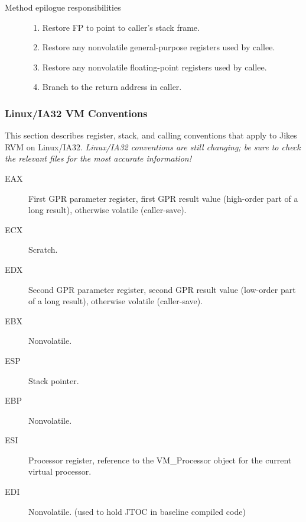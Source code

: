 \begin{description}
\item [Method epilogue responsibilities]

\begin{enumerate}
\item Restore FP to point to caller's stack frame.

\item Restore any nonvolatile general-purpose registers used by callee.

\item Restore any nonvolatile floating-point registers used by callee.

\item Branch to the return address in caller.
\end{enumerate}
\end{description}

\subsubsection{Linux/IA32 VM Conventions} \label{lintel-conventions}

This section describes register, stack, and calling conventions that
apply to Jikes RVM on Linux/IA32.  {\em Linux/IA32 conventions are still
changing; be sure to check the relevant files for the most accurate
information!}


\begin{description}
\item [EAX]
    First GPR parameter register, first GPR result value (high-order part
    of a long result), otherwise volatile (caller-save).

\item[ECX]
    Scratch.

\item[EDX]
    Second GPR parameter register, second GPR result value (low-order part
    of a long result), otherwise volatile (caller-save).

\item[EBX]
    Nonvolatile.

\item[ESP]
    Stack pointer.

\item[EBP]
    Nonvolatile.

\item[ESI]
    Processor register, reference to the VM\_Processor object for the current
    virtual processor.

\item[EDI]
    Nonvolatile.  (used to hold JTOC in baseline compiled code)

\end{description}

